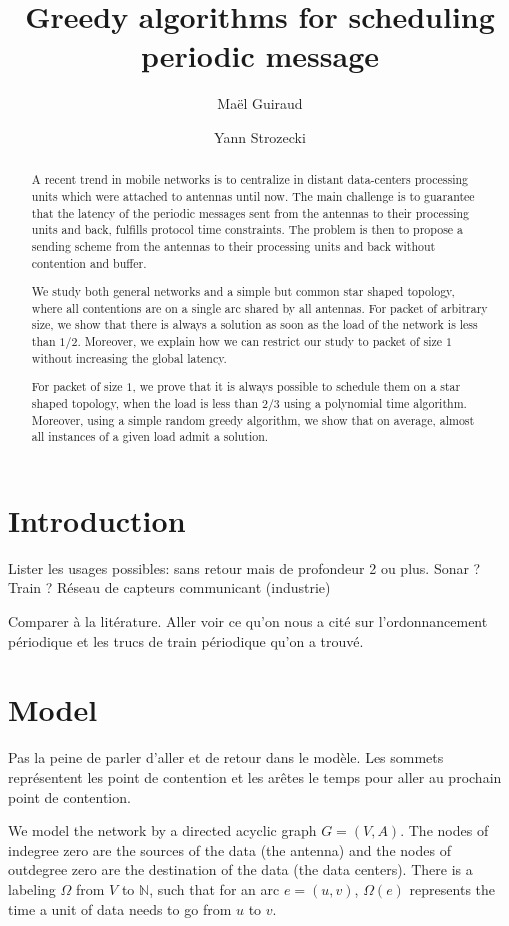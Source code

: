\documentclass[10pt, conference, letterpaper]{IEEEtran}
\title{Greedy algorithms for scheduling periodic message }
\author[1,2]{Ma\"el Guiraud}
\author[1]{Yann Strozecki}
\affil[1]{David Laboratory, UVSQ}
\affil[2]{Nokia Bell Labs France}
\begin{document}
\maketitle

\begin{abstract}

A recent trend in mobile networks is to centralize in distant data-centers processing units which were attached to antennas until now. The main challenge is to guarantee that the latency of the periodic messages sent from the antennas to their processing units and back, fulfills protocol time constraints. The problem is then to propose a sending scheme from the antennas to their processing units and back without contention and buffer.

We study both general networks and a simple but common star shaped topology, where all contentions are on a single arc shared by all antennas. For packet of arbitrary size, 
we show that there is always a solution as soon as the load of the network is less than $1/2$. Moreover, we explain how we can restrict our study to packet of size $1$ without increasing the global latency. 

For packet of size $1$, we prove that it is always possible to schedule them on a star shaped topology, when the load is less than $2/3$ using a polynomial time algorithm.
Moreover, using a simple random greedy algorithm, we show that on average, almost all
instances of a given load admit a solution.  
\end{abstract}


\section{Introduction}

Lister les usages possibles: 
sans retour mais de profondeur 2 ou plus. Sonar ? Train ?
Réseau de capteurs communicant (industrie)

Comparer à la litérature. Aller voir ce qu'on nous a cité sur l'ordonnancement périodique 
et les trucs de train périodique qu'on a trouvé.

\section{Model}
Pas la peine de parler d'aller et de retour dans le modèle.
Les sommets représentent les point de contention et les arêtes le
temps pour aller au prochain point de contention.


We model the network by a directed acyclic graph $G = (V,A)$. 
The nodes of indegree zero are the sources of the data (the antenna)
and the nodes of outdegree zero are the destination of the data (the data centers).
There is a labeling $\Omega$ from $V$ to $\mathbb{N}$, such that for an arc $e = (u,v)$, $\Omega(e)$ represents the time a unit of data needs to go from $u$ to $v$. 
\end{document}
